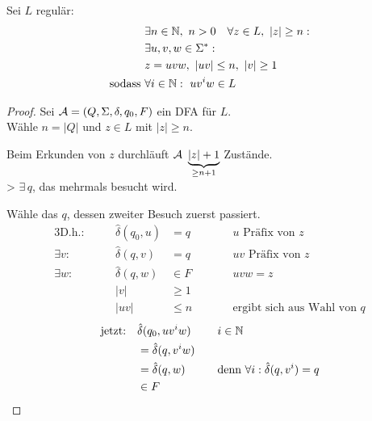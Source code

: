 \begin{lemma}\label{lem:pumping}
	Sei $L$ regulär:
	\begin{alignat*}{2}
		&\exists n\in\mathbb{N},\ n>0\quad \forall z\in L,\ |z|\geq n:\\
		&\exists u,v,w\in\Sigma^* :\\
		&z = uvw,\ |uv| \leq n,\ |v| \geq 1\\
		\text{sodass }& \forall i\in\mathbb{N}:\ uv^iw\in L
	\end{alignat*}
\end{lemma}
\vspace{-1em}
\begin{proof}
	Sei $\mathcal{A}=(Q,\Sigma,\delta,q_0,F)$ ein \ac{DFA} für $L$.\\
	Wähle $n=|Q|$ und $z\in L$ mit $|z|\geq n$.
	
	Beim Erkunden von $z$ durchläuft $\mathcal{A}\ \underbrace{|z|+1}_{\geq n+1}$ Zustände.\\
	\-> $\exists\, q$, das mehrmals besucht wird.
	
	Wähle das $q$, dessen zweiter Besuch zuerst passiert.
	\begin{alignat*}{3}
		\text{D.h.}:&\quad& \hat\delta(q_0,u)&=q &\qquad& u\text{ Präfix von }z\\
		\exists v:&& \hat\delta(q,v)&=q && uv\text{ Präfix von }z\\
		\exists w:&& \hat\delta(q,w)&\in F && uvw=z\\
		&& |v| &\geq 1\\
		&& |uv| &\leq n && \text{ergibt sich aus Wahl von }q
	\end{alignat*}
	\begin{alignat*}{2}
		\text{jetzt:}\quad &\hat\delta(q_0,uv^iw) &\quad& i\in\mathbb{N}\\
		&= \hat\delta(q,v^iw)\\
		&= \hat\delta(q,w) && \text{denn }\forall i: \hat\delta(q,v^i)=q\\
		&\in F \tag*{\qedhere}
	\end{alignat*}
\end{proof}
%
